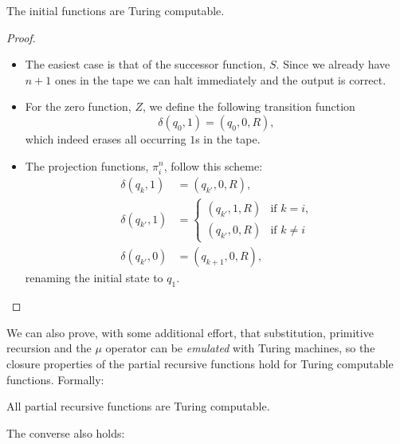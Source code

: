 \documentclass[../main.tex]{memoir}
\begin{document}
\begin{theorem}
  The initial functions are Turing computable.
\end{theorem}
\begin{proof}
  \begin{itemize}
  \item The easiest case is that of the successor function, $S$. Since we already have $n + 1$ ones in the tape we can halt immediately and the output is correct.
  \item For the zero function, $Z$, we define the following transition function
    \[
      \delta(q_0, 1) = (q_0, 0, R),
    \]
    which indeed erases all occurring $1$s in the tape.
  \item The projection functions, $\pi_i^n$, follow this scheme:
    \begin{align*}
      \delta(q_k, 1) & = (q_{k'}, 0, R), \\
      \delta(q_{k'}, 1) & = \left\{
        \begin{array}{lr}
          (q_{k'}, 1, R) & \text{if } k = i \text{,} \\
          (q_{k'}, 0, R) & \text{if } k \neq i
        \end{array} \right.\\
      \delta(q_{k'}, 0) & = (q_{k + 1}, 0, R),
    \end{align*}
    renaming the initial state to $q_1$.
  \end{itemize}
\end{proof}

We can also prove, with some additional effort, that substitution, primitive recursion and the $\mu$ operator can be \textit{emulated} with Turing machines, so the closure properties of the partial recursive functions hold for Turing computable functions. Formally:

\begin{theorem}
  All partial recursive functions are Turing computable.
\end{theorem}

The converse also holds:
\end{document}
